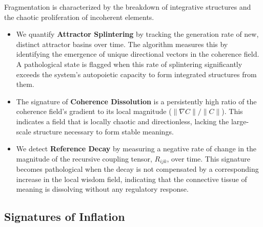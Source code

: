Fragmentation is characterized by the breakdown of integrative structures and the chaotic proliferation of incoherent elements.
\begin{itemize}
    \item We quantify \textbf{Attractor Splintering} by tracking the generation rate of new, distinct attractor basins over time. The algorithm measures this by identifying the emergence of unique directional vectors in the coherence field. A pathological state is flagged when this rate of splintering significantly exceeds the system's autopoietic capacity to form integrated structures from them.
    \item The signature of \textbf{Coherence Dissolution} is a persistently high ratio of the coherence field's gradient to its local magnitude (\(\|\nabla C\| / \|C\|\)). This indicates a field that is locally chaotic and directionless, lacking the large-scale structure necessary to form stable meanings.
    \item We detect \textbf{Reference Decay} by measuring a negative rate of change in the magnitude of the recursive coupling tensor, \(R_{ijk}\), over time. This signature becomes pathological when the decay is not compensated by a corresponding increase in the local wisdom field, indicating that the connective tissue of meaning is dissolving without any regulatory response.
\end{itemize}


\subsection{Signatures of Inflation}
\label{sec:signatures_of_inflation}

